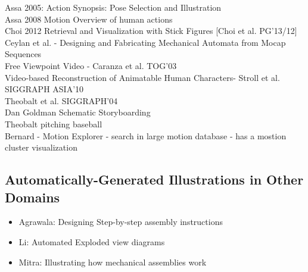 
Assa 2005: Action Synopsis: Pose Selection and Illustration~\cite{assa2005action}\\
Assa 2008 Motion Overview of human actions~\cite{assa2008motion}\\
Choi 2012 Retrieval and Visualization with Stick Figures [Choi et al. PG'13/12]~\cite{choi2012retrieval}\\
Ceylan et al. - Designing and Fabricating Mechanical Automata from Mocap Sequences~\cite{ceylan2013designing}\\
Free Viewpoint Video - Caranza et al. TOG'03~\cite{carranza2003free}\\
Video-based Reconstruction of Animatable Human Characters- Stroll et al. SIGGRAPH ASIA'10\\
Theobalt et al. SIGGRAPH'04\\
Dan Goldman Schematic Storyboarding~\cite{Goldman2006Schematic}\\
Theobalt pitching baseball~\cite{theobalt2004pitching}\\
Bernard - Motion Explorer - search in large motion database - has a mostion cluster visualization ~\cite{bernard2013motionexplorer}


\subsection{Automatically-Generated Illustrations in Other Domains}
\begin{itemize}
\item Agrawala: Designing Step-by-step assembly instructions~\cite{agrawala2003designing}
\item Li: Automated Exploded view diagrams~\cite{li2008automated}
\item Mitra: Illustrating how mechanical assemblies work ~\cite{mitra2010illustrating}
\end{itemize}

